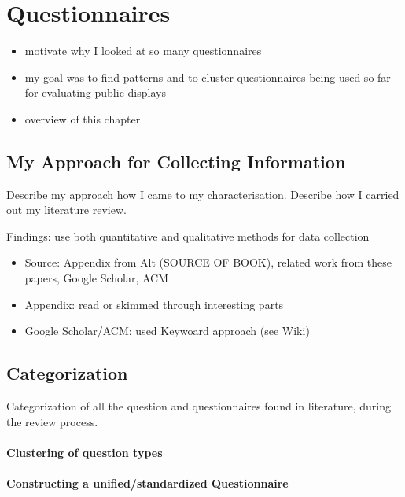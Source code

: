\section{Questionnaires}


\begin{itemize}[itemsep=0pt] 
\item motivate why I looked at so many questionnaires
\item my goal was to find patterns and to cluster questionnaires being used so far for evaluating public displays
\item overview of this chapter
\end{itemize}




\subsection{My Approach for Collecting Information}

Describe my approach how I came to my characterisation. Describe how I carried out my literature review.

Findings: use both quantitative and qualitative methods for data collection

\begin{itemize}[itemsep=0pt] 
\item Source: Appendix from Alt (SOURCE OF BOOK), related work from these papers, Google Scholar, ACM
\item Appendix: read or skimmed through interesting parts
\item Google Scholar/ACM: used Keywoard approach (see Wiki)
\end{itemize}



\subsection{Categorization}

Categorization of all the question and questionnaires found in literature, during the review process.

\paragraph{Clustering of question types}

\paragraph{Constructing a unified/standardized Questionnaire}

